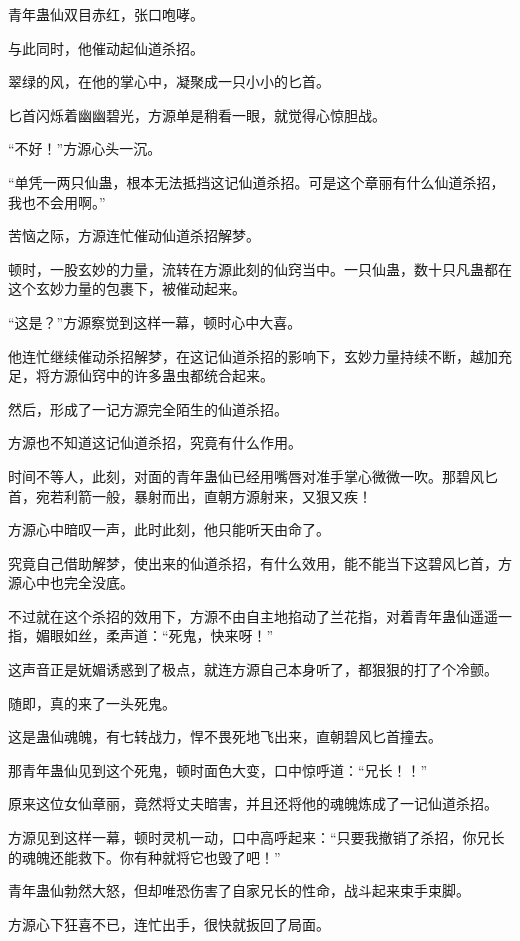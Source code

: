 \begin{this_body}
青年蛊仙双目赤红，张口咆哮。

与此同时，他催动起仙道杀招。

翠绿的风，在他的掌心中，凝聚成一只小小的匕首。

匕首闪烁着幽幽碧光，方源单是稍看一眼，就觉得心惊胆战。

“不好！”方源心头一沉。

“单凭一两只仙蛊，根本无法抵挡这记仙道杀招。可是这个章丽有什么仙道杀招，我也不会用啊。”

苦恼之际，方源连忙催动仙道杀招解梦。

顿时，一股玄妙的力量，流转在方源此刻的仙窍当中。一只仙蛊，数十只凡蛊都在这个玄妙力量的包裹下，被催动起来。

“这是？”方源察觉到这样一幕，顿时心中大喜。

他连忙继续催动杀招解梦，在这记仙道杀招的影响下，玄妙力量持续不断，越加充足，将方源仙窍中的许多蛊虫都统合起来。

然后，形成了一记方源完全陌生的仙道杀招。

方源也不知道这记仙道杀招，究竟有什么作用。

时间不等人，此刻，对面的青年蛊仙已经用嘴唇对准手掌心微微一吹。那碧风匕首，宛若利箭一般，暴射而出，直朝方源射来，又狠又疾！

方源心中暗叹一声，此时此刻，他只能听天由命了。

究竟自己借助解梦，使出来的仙道杀招，有什么效用，能不能当下这碧风匕首，方源心中也完全没底。

不过就在这个杀招的效用下，方源不由自主地掐动了兰花指，对着青年蛊仙遥遥一指，媚眼如丝，柔声道：“死鬼，快来呀！”

这声音正是妩媚诱惑到了极点，就连方源自己本身听了，都狠狠的打了个冷颤。

随即，真的来了一头死鬼。

这是蛊仙魂魄，有七转战力，悍不畏死地飞出来，直朝碧风匕首撞去。

那青年蛊仙见到这个死鬼，顿时面色大变，口中惊呼道：“兄长！！”

原来这位女仙章丽，竟然将丈夫暗害，并且还将他的魂魄炼成了一记仙道杀招。

方源见到这样一幕，顿时灵机一动，口中高呼起来：“只要我撤销了杀招，你兄长的魂魄还能救下。你有种就将它也毁了吧！”

青年蛊仙勃然大怒，但却唯恐伤害了自家兄长的性命，战斗起来束手束脚。

方源心下狂喜不已，连忙出手，很快就扳回了局面。


\end{this_body}
